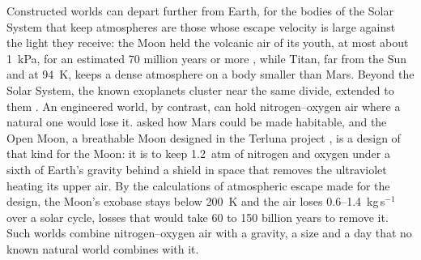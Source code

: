 Constructed worlds can depart further from Earth, for the bodies of the Solar System that keep atmospheres are those
whose escape velocity is large against the light they receive: the Moon held the volcanic air of its youth, at
most about 1~kPa, for an estimated 70 million years or more \autocite{needham2017lunar}, while Titan, far from the Sun and at
94~K, keeps a dense atmosphere on a body smaller than Mars. Beyond the Solar System, the known exoplanets cluster
near the same divide, extended to them \autocite{zahnle2017cosmic}. An engineered world, by contrast, can hold
nitrogen--oxygen air where a natural one would lose it. \textcite{mckay1991making} asked how Mars could be made
habitable, and the Open Moon, a breathable Moon designed in the Terluna project \autocite{goldman2026terluna}, is
a design of that kind for the Moon: it is to keep 1.2~atm of nitrogen and oxygen under a sixth of Earth's gravity
behind a shield in space that removes the ultraviolet heating its upper air. By the calculations of atmospheric
escape made for the design, the Moon's exobase stays below 200~K and the air loses 0.6--1.4~kg\,s$^{-1}$ over a solar cycle, losses that would take 60
to 150 billion years to remove it. Such worlds combine nitrogen--oxygen air with a gravity, a size and
a day that no known natural world combines with it.

